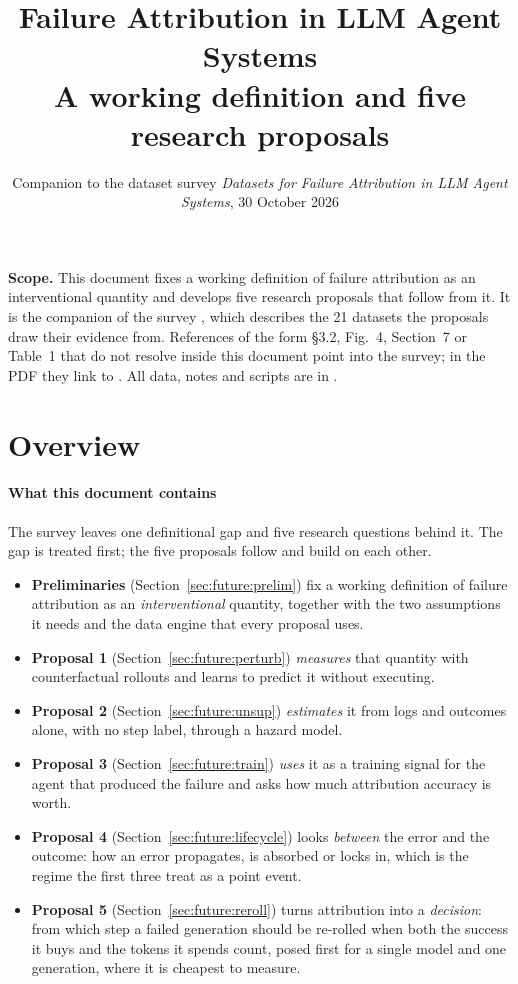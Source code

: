 \documentclass[10pt,a4paper]{article}
\title{\vspace{-9mm}\LARGE Failure Attribution in LLM Agent Systems\\[3pt]\large A working definition and five research proposals}
\author{\normalsize Companion to the dataset survey \emph{Datasets for Failure Attribution in LLM Agent Systems}, 30 October 2026}\date{}
\begin{document}
\maketitle\vspace{-7mm}
\begin{tcolorbox}[enhanced,colback=surface,colframe=rule,boxrule=0.3pt,arc=1.5pt,left=5pt,right=5pt,top=3pt,bottom=3pt,fontupper=\small]
\textbf{Scope.} This document fixes a working definition of failure attribution as an interventional quantity and develops five research proposals that follow from it. It is the companion of the survey , which describes the 21 datasets the proposals draw their evidence from. References of the form \S3.2, Fig.~4, Section~7 or Table~1 that do not resolve inside this document point into the survey; in the PDF they link to . All data, notes and scripts are in .
\end{tcolorbox}
\vspace{-2pt}\tableofcontents

\section{Overview}\label{sec:future}

\paragraph{What this document contains} The survey leaves one definitional gap and five research questions behind it. The gap is treated first; the five proposals follow and build on each other.
\begin{itemize}[leftmargin=1.1em]
\item \textbf{Preliminaries} (Section~\ref{sec:future:prelim}) fix a working definition of failure attribution as an \emph{interventional} quantity, together with the two assumptions it needs and the data engine that every proposal uses.
\item \textbf{Proposal 1} (Section~\ref{sec:future:perturb}) \emph{measures} that quantity with counterfactual rollouts and learns to predict it without executing.
\item \textbf{Proposal 2} (Section~\ref{sec:future:unsup}) \emph{estimates} it from logs and outcomes alone, with no step label, through a hazard model.
\item \textbf{Proposal 3} (Section~\ref{sec:future:train}) \emph{uses} it as a training signal for the agent that produced the failure and asks how much attribution accuracy is worth.
\item \textbf{Proposal 4} (Section~\ref{sec:future:lifecycle}) looks \emph{between} the error and the outcome: how an error propagates, is absorbed or locks in, which is the regime the first three treat as a point event.
\item \textbf{Proposal 5} (Section~\ref{sec:future:reroll}) turns attribution into a \emph{decision}: from which step a failed generation should be re-rolled when both the success it buys and the tokens it spends count, posed first for a single model and one generation, where it is cheapest to measure.
\end{itemize}
\end{document}
